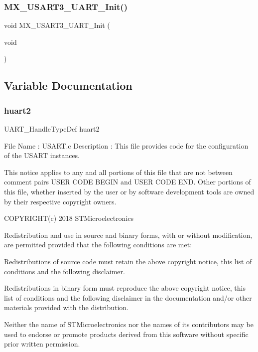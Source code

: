 \subsubsection{M\+X\+\_\+\+U\+S\+A\+R\+T3\+\_\+\+U\+A\+R\+T\+\_\+\+Init()}
{\footnotesize\ttfamily void M\+X\+\_\+\+U\+S\+A\+R\+T3\+\_\+\+U\+A\+R\+T\+\_\+\+Init (\begin{DoxyParamCaption}\item[{void}]{ }\end{DoxyParamCaption})}



\subsection{Variable Documentation}
\mbox{\label{usart_8c_aa9479c261d65eecedd3d9582f7f0f89c}} 
\subsubsection{huart2}
{\footnotesize\ttfamily U\+A\+R\+T\+\_\+\+Handle\+Type\+Def huart2}

File Name \+: U\+S\+A\+R\+T.\+c Description \+: This file provides code for the configuration of the U\+S\+A\+RT instances.

This notice applies to any and all portions of this file that are not between comment pairs U\+S\+ER C\+O\+DE B\+E\+G\+IN and U\+S\+ER C\+O\+DE E\+ND. Other portions of this file, whether inserted by the user or by software development tools are owned by their respective copyright owners.

C\+O\+P\+Y\+R\+I\+G\+H\+T(c) 2018 S\+T\+Microelectronics

Redistribution and use in source and binary forms, with or without modification, are permitted provided that the following conditions are met\+:
\begin{DoxyEnumerate}
\item Redistributions of source code must retain the above copyright notice, this list of conditions and the following disclaimer.
\item Redistributions in binary form must reproduce the above copyright notice, this list of conditions and the following disclaimer in the documentation and/or other materials provided with the distribution.
\item Neither the name of S\+T\+Microelectronics nor the names of its contributors may be used to endorse or promote products derived from this software without specific prior written permission.
\end{DoxyEnumerate}

